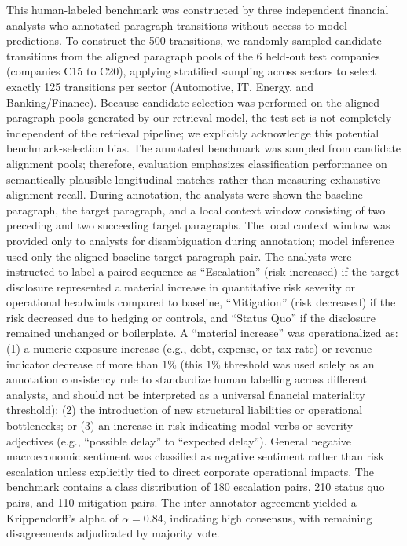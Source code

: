 \documentclass[journal]{IEEEtran}
\begin{document}
This human-labeled benchmark was constructed by three independent financial analysts who annotated paragraph transitions without access to model predictions. To construct the 500 transitions, we randomly sampled candidate transitions from the aligned paragraph pools of the 6 held-out test companies (companies C15 to C20), applying stratified sampling across sectors to select exactly 125 transitions per sector (Automotive, IT, Energy, and Banking/Finance). Because candidate selection was performed on the aligned paragraph pools generated by our retrieval model, the test set is not completely independent of the retrieval pipeline; we explicitly acknowledge this potential benchmark-selection bias. The annotated benchmark was sampled from candidate alignment pools; therefore, evaluation emphasizes classification performance on semantically plausible longitudinal matches rather than measuring exhaustive alignment recall. During annotation, the analysts were shown the baseline paragraph, the target paragraph, and a local context window consisting of two preceding and two succeeding target paragraphs. The local context window was provided only to analysts for disambiguation during annotation; model inference used only the aligned baseline-target paragraph pair. The analysts were instructed to label a paired sequence as ``Escalation'' (risk increased) if the target disclosure represented a material increase in quantitative risk severity or operational headwinds compared to baseline, ``Mitigation'' (risk decreased) if the risk decreased due to hedging or controls, and ``Status Quo'' if the disclosure remained unchanged or boilerplate. A ``material increase'' was operationalized as: (1) a numeric exposure increase (e.g., debt, expense, or tax rate) or revenue indicator decrease of more than 1\% (this 1\% threshold was used solely as an annotation consistency rule to standardize human labelling across different analysts, and should not be interpreted as a universal financial materiality threshold); (2) the introduction of new structural liabilities or operational bottlenecks; or (3) an increase in risk-indicating modal verbs or severity adjectives (e.g., ``possible delay'' to ``expected delay''). General negative macroeconomic sentiment was classified as negative sentiment rather than risk escalation unless explicitly tied to direct corporate operational impacts. The benchmark contains a class distribution of 180 escalation pairs, 210 status quo pairs, and 110 mitigation pairs. The inter-annotator agreement yielded a Krippendorff's alpha of $\alpha = 0.84$, indicating high consensus, with remaining disagreements adjudicated by majority vote.
\end{document}

